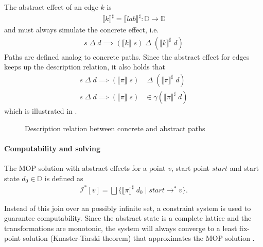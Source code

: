 The abstract effect of an edge $k$ is
\begin{align}
\llbracket k \rrbracket^\sharp = \llbracket lab \rrbracket^\sharp : \mathbb{D} \to \mathbb{D}
\end{align}
and must always simulate the concrete effect, i.e.
\begin{align}
s \;\Delta\; d \implies (\llbracket k \rrbracket\; s) \;\Delta\; (\llbracket k \rrbracket^\sharp\; d)
\end{align}
Paths are defined analog to concrete paths.
Since the abstract effect for edges keeps up the description relation, it also holds that
\begin{align}
s \;\Delta\; d \implies (\llbracket \pi \rrbracket\; s) &\;\Delta\; (\llbracket \pi \rrbracket^\sharp\; d)\\
s \;\Delta\; d \implies (\llbracket \pi \rrbracket\; s) &\in \gamma (\llbracket \pi \rrbracket^\sharp\; d)
\end{align}
which is illustrated in .
\begin{figure}[ht]
\centering
{}
  \caption{Description relation between concrete and abstract paths \cite{seidl2009uebersetzerbau}}
  \label{fig:descrRel}
\end{figure}

\paragraph*{Computability and solving}
The MOP solution with abstract effects for a point $v$, start point $start$ and start state $d_0 \in \mathbb{D}$ is defined as
\begin{align}
\mathcal{I}^*[v] = \bigsqcup \{\llbracket \pi \rrbracket^\sharp \; d_0 \; | \; start \to^* v\}.
\end{align}

Instead of this join over an possibly infinite set, a constraint system is used to guarantee computability. Since the abstract state is a complete lattice and the transformations are monotonic, the system will always converge to a least fix-point solution (Knaster-Tarski theorem) that approximates the MOP solution \cite{kam1977monotone}\cite{Kam:1976:GDF:321921.321938}. %

